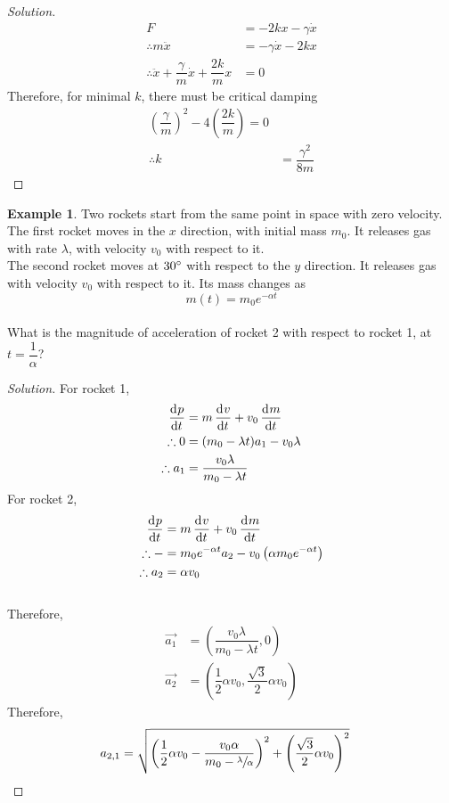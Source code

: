 \documentclass[fleqn, a4paper, 12pt]{article}
\theoremstyle{definition}
\newtheorem{example}{Example}
\theoremstyle{theorem}
\newenvironment{solution}
{\begin{proof}[Solution]\let\qed\relax}
	{\end{proof}}
\begin{document}
\begin{solution}
	\begin{align*}
		F &= - 2 k x - \gamma \dot{x}\\
		\therefore m \ddot{x} &= -\gamma \dot{x} - 2 k x\\
		\therefore \ddot{x} + \dfrac{\gamma}{m} \dot{x} + \dfrac{2 k}{m} x &= 0
	\end{align*}
	Therefore, for minimal $k$, there must be critical damping
	\begin{align*}
		\left( \dfrac{\gamma}{m} \right)^2 - 4 \left( \dfrac{2k}{m} \right) = 0\\
		\therefore k &= \dfrac{\gamma^2}{8m}
	\end{align*}
\end{solution}

\begin{example}
	Two rockets start from the same point in space with zero velocity.\\
	The first rocket moves in the $x$ direction, with initial mass $m_0$. It releases gas with rate $\lambda$, with velocity $v_0$ with respect to it.\\
	The second rocket moves at $30 \degree$ with respect to the $y$ direction. It releases gas with velocity $v_0$ with respect to it. Its mass changes as
	\begin{equation*}
		m(t) = m_0 e^{- \alpha t}
	\end{equation*}\\
	What is the magnitude of acceleration of rocket 2 with respect to rocket 1, at $t = \dfrac{1}{\alpha}$?
\end{example}

\begin{solution}
	For rocket 1,
	\begin{align*}
		\dod{p}{t} &= m \dod{v}{t} + v_0 \dod{m}{t}\\
		\therefore 0 &= (m_0 - \lambda t) a_1 - v_0 \lambda\\
		\therefore a_1 &= \dfrac{v_0 \lambda}{m_0 - \lambda t}
	\end{align*}
	For rocket 2,
	\begin{align*}
		\dod{p}{t} &= m \dod{v}{t} + v_0 \dod{m}{t}\\
		\therefore - &= m_0 e^{-\alpha t} a_2 - v_0 \left( \alpha m_0 e^{-\alpha t} \right)\\
		\therefore a_2 &= \alpha v_0
	\end{align*}\\
	Therefore,
	\begin{align*}
		\overrightarrow{a_1} &= \left( \dfrac{v_0 \lambda}{m_0 - \lambda t} , 0 \right)\\
		\overrightarrow{a_2} &= \left( \dfrac{1}{2} \alpha v_0 , \dfrac{\sqrt{3}}{2} \alpha v_0 \right)
	\end{align*}
	Therefore,
	\begin{align*}
		a_{2,1} &= \sqrt{\left( \dfrac{1}{2} \alpha v_0 - \dfrac{v_0 \alpha}{m_0 - \sfrac{\lambda}{\alpha}} \right)^2 + \left( \dfrac{\sqrt{3}}{2} \alpha v_0 \right)^2}
	\end{align*}
\end{solution}
\end{document}

